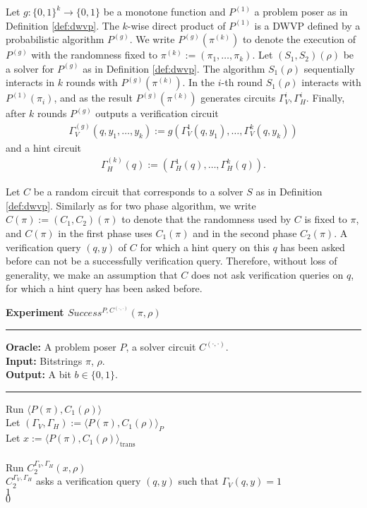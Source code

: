 \begin{definition}
  Let $g: \{0,1\}^{k} \rightarrow \{0,1\}$ be a monotone function and $P^{(1)}$ a problem poser as in Definition \ref{def:dwvp}.
  The $k$-wise direct product of $P^{(1)}$ is a DWVP defined by a probabilistic algorithm $P^{(g)}$.
  We write $P^{(g)}(\pi^{(k)})$ to denote the execution of $P^{(g)}$ with the randomness fixed to $\pi^{(k)} := (\pi_1, \dots, \pi_k)$.
  Let $(S_1, S_2)(\rho)$ be a solver for $P^{(g)}$ as in Definition \ref{def:dwvp}.
  The algorithm $S_1(\rho)$ sequentially interacts in $k$ rounds with $P^{(g)}(\pi^{(k)})$.
  In the $i$-th round $S_1(\rho)$ interacts with $P^{(1)}(\pi_i)$,
  and as the result $P^{(g)}(\pi^{(k)})$ generates circuits $\Gamma_V^i, \Gamma_H^i$.
  Finally, after $k$ rounds $P^{(g)}$ outputs a verification circuit
\begin{align*}
  \Gamma_V^{(g)} (q, y_1, \dots, y_k) := g(\Gamma_V^{1}(q, y_1), \dots, \Gamma_V^{k}(q, y_k))
\end{align*}
and a hint circuit
\begin{align*}
  \Gamma_H^{(k)} (q) := (\Gamma_H^{1}(q), \dots, \Gamma_H^{k}(q)).
\end{align*}
\end{definition}
%
Let $C$ be a random circuit that corresponds to a solver $S$ as in Definition \ref{def:dwvp}.
Similarly as for two phase algorithm, we write $C(\pi) := (C_1, C_2)(\pi)$ to denote that the randomness used by $C$
is fixed to $\pi$, and $C(\pi)$ in the first phase uses $C_1(\pi)$ and in the second phase $C_2(\pi)$.
%
A verification query $(q,y)$ of $C$ for which a hint query on this $q$ has been asked before can not be a successfully verification query.
Therefore, without loss of generality, we make an assumption that $C$ does not ask verification queries on $q$,
for which a hint query has been asked before.
%
\begin{codeblock}
  \textbf{Experiment $Success^{P, C^{(\cdot, \cdot)}}(\pi, \rho) $}
  \medskip
  \hrule
  \medskip
  \textbf{Oracle:} A problem poser $P$, a solver circuit $C^{(\cdot,\cdot)}$.\\
  \textbf{Input:}  Bitstrings $\pi$, $\rho$.\\
  \textbf{Output:} A bit $b \in \{0,1\}$.
  \medskip\hrule\medskip
  Run $\langle P(\pi), C_1(\rho) \rangle$ \\
  \IndI Let $(\Gamma_V, \Gamma_H) := \langle P(\pi), C_1(\rho) \rangle_{P}$ \\
  \IndI Let $x := \langle P(\pi), C_1(\rho) \rangle_{\text{trans}}$ \\ \\
  Run $C_2^{\Gamma_V,\Gamma_H}(x, \rho)$ \\
  \IndI \If $C_2^{\Gamma_V, \Gamma_H}$ asks a verification query $(q, y)$ such that $\Gamma_V(q, y) = 1$ \then \\
  \IndII \return $1$ \\
  \return $0$ \\
\end{codeblock}
